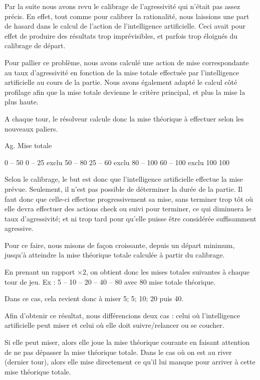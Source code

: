 \documentclass{report}
\begin{document}
\hspace{0.5cm}Par la suite nous avons revu le calibrage de l'agressivité qui n'était pas assez précis. En effet, tout comme pour calibrer la rationalité, nous laissions une part de hasard dans le calcul de l'action de l'intelligence artificielle. Ceci avait pour effet de produire des résultats trop imprévisibles, et parfois trop éloignés du calibrage de départ.\par
Pour pallier ce problème, nous avons calculé une action de mise correspondante au taux d'agressivité en fonction de la mise totale effectuée par l'intelligence artificielle au cours de la partie. Nous avons également adapté le calcul côté profilage afin que la mise totale devienne le critère principal, et plus la mise la plus haute.\par
A chaque tour, le résolveur calcule donc la mise théorique à effectuer selon les nouveaux paliers.

	Ag.		Mise totale

	0 – 50		0 – 25	exclu
	50 – 80		25 – 60 exclu
	80 – 100	60 – 100 exclu
	100			100

Selon le calibrage, le but est donc que l'intelligence artificielle effectue la mise prévue. Seulement, il n'est pas possible de déterminer la durée de la partie. Il faut donc que celle-ci effectue progressivement sa mise, sans terminer trop tôt où elle devra effectuer des actions check ou suivi pour terminer, ce qui diminuera le taux d'agressivité; et ni trop tard pour qu'elle puisse être considérée suffisamment agressive.\par
Pour ce faire, nous misons de façon croissante, depuis un départ minimum, jusqu'à atteindre la mise théorique totale calculée à partir du calibrage.\par
En prenant un rapport $\times2$, on obtient donc les mises totales suivantes à chaque tour de jeu.
Ex : 	5 – 10 – 20 – 40 – 80 		avec 80 mise totale théorique.

Dans ce cas, cela revient donc à miser 5; 5; 10; 20 puis 40.

Afin d'obtenir ce résultat, nous différencions deux cas : celui où l'intelligence artificielle peut miser et celui où elle doit suivre/relancer ou se coucher.\par
Si elle peut miser, alors elle joue la mise théorique courante en faisant attention de ne pas dépasser la mise théorique totale. Dans le cas où on est au river (dernier tour), alors elle mise directement ce qu'il lui manque pour arriver à cette mise théorique totale.\par
\end{document}

